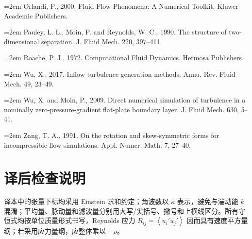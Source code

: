 \documentclass[12pt,a4paper,openany,fontset=none]{ctexbook}
\newcommand{\avg}[1]{\left\langle #1\right\rangle}
\begin{document}
\par\hangindent=2em Orlandi, P., 2000. Fluid Flow Phenomena: A Numerical Toolkit. Kluwer Academic Publishers.
\par\hangindent=2em Pauley, L. L., Moin, P. and Reynolds, W. C., 1990. The structure of two-dimensional separation. J. Fluid Mech. 220, 397–411.
\par\hangindent=2em Roache, P. J., 1972. Computational Fluid Dynamics. Hermosa Publishers.
\par\hangindent=2em Wu, X., 2017. Inflow turbulence generation methods. Annu. Rev. Fluid Mech. 49, 23–49.
\par\hangindent=2em Wu, X. and Moin, P., 2009. Direct numerical simulation of turbulence in a nominally zero-pressure-gradient flat-plate boundary layer. J. Fluid Mech. 630, 5–41.
\par\hangindent=2em Zang, T. A., 1991. On the rotation and skew-symmetric forms for incompressible flow simulations. Appl. Numer. Math. 7, 27–40.
\endgroup

\chapter*{译后检查说明}
译本中的张量下标均采用 Einstein 求和约定；角波数以 $\kappa$ 表示，避免与湍动能 $k$ 混淆；平均量、脉动量和滤波量分别用大写/尖括号、撇号和上横线区分。所有守恒式均按单位质量形式书写，Reynolds 应力 $R_{ij}=\avg{u_i'u_j'}$ 因而具有速度平方量纲；若采用应力量纲，应整体乘以 $-\rho$。
\end{document}
